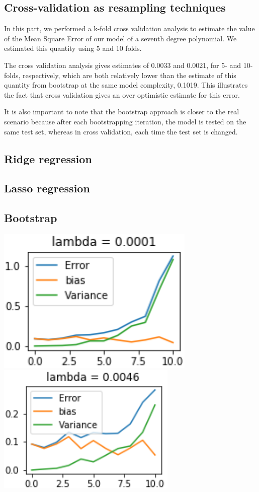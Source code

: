\documentclass{article}
\begin{document}
\subsection{Cross-validation as resampling techniques}
In this part, we performed a k-fold cross validation analysis to estimate the value of the Mean Square Error of our model of a seventh degree polynomial. We estimated this quantity using 5 and 10 folds.

The cross validation analysis gives estimates of 0.0033 and 0.0021, for 5- and 10-folds, respectively, which are both relatively lower than the estimate of this quantity from bootstrap at the same model complexity, 0.1019. This illustrates the fact that cross validation gives an over optimistic estimate for this error.

It is also important to note that the bootstrap approach is closer to the real scenario because after each bootstrapping iteration, the model is tested on the same test set, whereas in cross validation, each time the test set is changed.


\subsection{Ridge regression}

\subsection{Lasso regression}

\subsection{Bootstrap}
\includegraphics[scale=1]{boostrapridge0.png}
\includegraphics[scale=1]{boostrapridge1.png}
\end{document}
